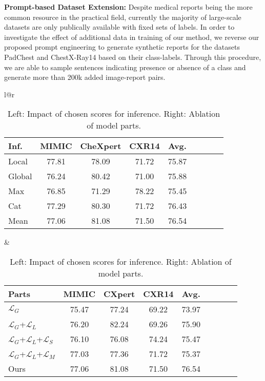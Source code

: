\documentclass[runningheads]{llncs}
\begin{document}
\noindent\textbf{Prompt-based Dataset Extension: } Despite medical reports being the more common resource in the practical field, currently the majority of large-scale datasets are only publically available with fixed sets of labels. In order to investigate the effect of additional data in training of our method, we reverse our proposed prompt engineering to generate synthetic reports for the datasets PadChest and ChestX-Ray14 based on their class-labels.
Through this procedure, we are able to sample sentences indicating presence or absence of a class and generate more than 200k added image-report pairs.

 \begin{table}[b]
    \centering
    \begin{tabular}{l@{\hspace{0.2cm}}r}
        \begin{tabular}{lcccccccc}
        \toprule
          Inf. & MIMIC   & CheXpert  & CXR14 & Avg.\\  
          \midrule
           Local & 77.81 & 78.09 & 71.72 & 75.87\\
           Global & 76.24 & 80.42 &   71.00 & 75.88\\
           \midrule
           Max  & 76.85 & 71.29 & 78.22 & 75.45\\
           Cat  & 77.29 & 80.30 & 71.72 & 76.43 \\
           Mean & 77.06  & 81.08 &  71.50 &  76.54 \\
          \bottomrule
        \end{tabular}
         &  
         \begin{tabular}{lcccccccc}
            \toprule
            
            Parts & MIMIC   & CXpert  & CXR14 & Avg.\\ 
              \midrule
               $\mathcal{L}_G$ & 75.47 & 77.24 & 69.22 & 73.97 \\ 
               $\mathcal{L}_G$+$\mathcal{L}_L$ & 76.20 & 82.24 & 69.26  &   75.90 \\ 
               $\mathcal{L}_G$+$\mathcal{L}_L$+$\mathcal{L}_S$ & 76.10 & 76.08 & 74.24 & 75.47 \\ 
               $\mathcal{L}_G$+$\mathcal{L}_L$+$\mathcal{L}_M$  & 77.03 & 77.36 & 71.72 & 75.37\\  
               \midrule
               Ours & 77.06 & 81.08 & 71.50 & 76.54 \\ 
              \bottomrule
            \end{tabular}
    \end{tabular}
    
    
    
    \caption{Left: Impact of chosen scores for inference. Right: Ablation of model parts.}
    \label{tab:head}
\end{table}
\end{document}
